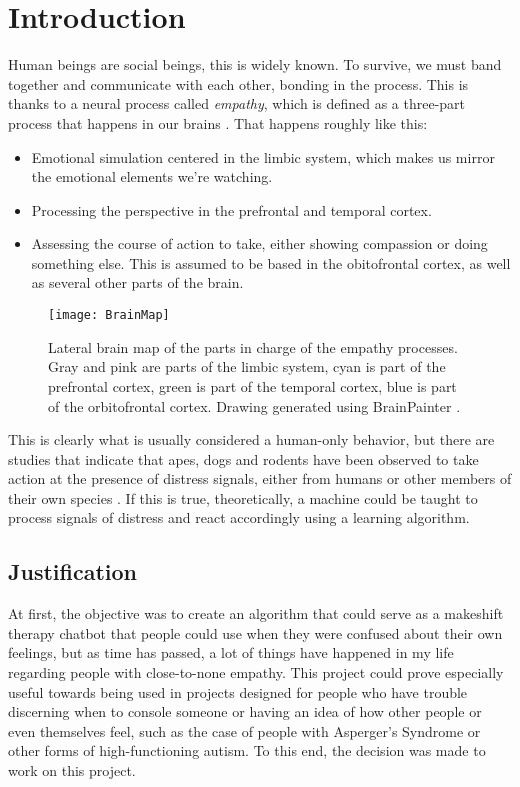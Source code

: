 \chapter{Introduction}
\label{ch1}
Human beings are social beings, this is widely known. To survive, we must band together and communicate with each other, bonding in the process. This is thanks to a neural process called \textit{empathy}, which is defined as a three-part process that happens in our brains \citep{rf1}. That happens roughly like this:
\begin{itemize}
	\item Emotional simulation centered in the limbic system, which makes us mirror the emotional elements we're watching.
	\item Processing the perspective in the prefrontal and temporal cortex.
	\item Assessing the course of action to take, either showing compassion or doing something else. This is assumed to be based in the obitofrontal cortex, as well as several other parts of the brain.	
\end{itemize}
\begin{figure}[!h]
	\centering
	\texttt{[image: BrainMap]}
	\caption[Lateral brain map of the parts in charge of empathy processes.]{Lateral brain map of the parts in charge of the empathy processes. Gray and pink are parts of the limbic system, cyan is part of the prefrontal cortex, green is part of the temporal cortex, blue is part of the orbitofrontal cortex. Drawing generated using BrainPainter \citep{img1}.}
	\label{fig:brainmap}
\end{figure}
This is clearly what is usually considered a human-only behavior, but there are studies that indicate that apes, dogs and rodents have been observed to take action at the presence of distress signals, either from humans or other members of their own species \citep{rf2}.
If this is true, theoretically, a machine could be taught to process signals of distress and react accordingly using a learning algorithm.

\section{Justification}
At first, the objective was to create an algorithm that could serve as a makeshift therapy chatbot that people could use when they were confused about their own feelings, but as time has passed, a lot of things have happened in my life regarding people with close-to-none empathy.
This project could prove especially useful towards being used in projects designed for people who have trouble discerning when to console someone or having an idea of how other people or even themselves feel, such as the case of people with Asperger's Syndrome or other forms of high-functioning autism.
To this end, the decision was made to work on this project.

